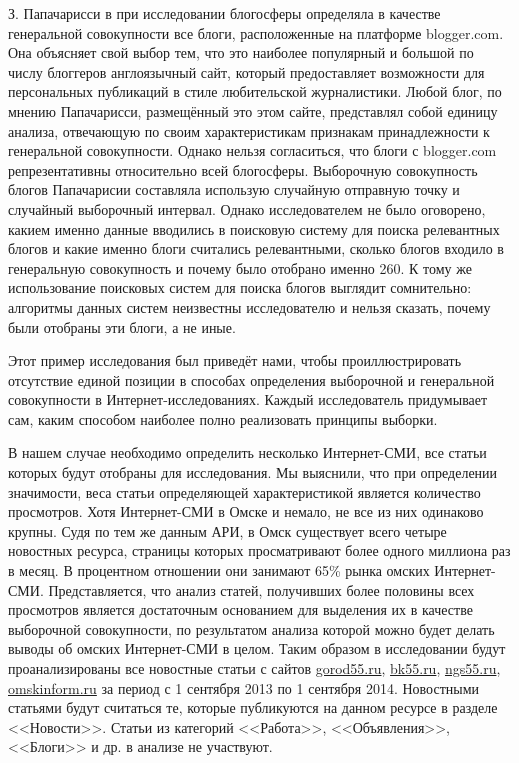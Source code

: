 З. Папачарисси в при исследовании блогосферы определяла в качестве генеральной совокупности все блоги, расположенные на платформе blogger.com. Она объясняет свой выбор тем, что это наиболее популярный и большой по числу блоггеров англоязычный сайт, который предоставляет возможности для персональных публикаций в стиле любительской журналистики. Любой блог, по мнению Папачарисси, размещённый это этом сайте, представлял собой единицу анализа, отвечающую по своим характеристикам признакам принадлежности к генеральной совокупности. Однако нельзя согласиться, что блоги с blogger.com репрезентативны относительно всей блогосферы. Выборочную совокупность блогов Папачарисии составляла использую случайную отправную точку и случайный выборочный интервал. Однако исследователем не было оговорено, какием именно данные вводились в поисковую систему для поиска релевантных блогов и какие именно блоги считались релевантными, сколько блогов входило в генеральную совокупность и почему было отобрано именно 260. К тому же использование поисковых систем для поиска блогов выглядит сомнительно: алгоритмы данных систем неизвестны исследователю и нельзя сказать, почему были отобраны эти блоги, а не иные.

Этот пример исследования был приведёт нами, чтобы проиллюстрировать отсутствие единой позиции в способах определения выборочной и генеральной совокупности в Интернет-исследованиях. Каждый исследователь придумывает сам, каким способом наиболее полно реализовать принципы выборки.

В нашем случае необходимо определить несколько Интернет-СМИ, все статьи которых будут отобраны для исследования. Мы выяснили, что при определении значимости, веса статьи определяющей характеристикой является количество просмотров. Хотя Интернет-СМИ в Омске и немало, не все из них одинаково крупны. Судя по тем же данным АРИ, в Омск существует всего четыре новостных ресурса, страницы которых просматривают более одного миллиона раз в месяц. В процентном отношении они занимают 65\% рынка омских Интернет-СМИ. Представляется, что анализ статей, получивших более половины всех просмотров является достаточным основанием для выделения их в качестве выборочной совокупности, по результатом анализа которой можно будет делать выводы об омских Интернет-СМИ в целом. Таким образом в исследовании будут проанализированы все новостные статьи с сайтов \href{http://gorod55.ru/}{gorod55.ru}, \href{http://bk55.ru/}{bk55.ru}, \href{http://ngs55.ru/}{ngs55.ru}, \href{http://omskinform.ru/}{omskinform.ru} за период с 1 сентября 2013 по 1 сентября 2014. Новостными статьями будут считаться те, которые публикуются на данном ресурсе в разделе <<Новости>>. Статьи из категорий <<Работа>>, <<Объявления>>, <<Блоги>> и др. в анализе не участвуют.

